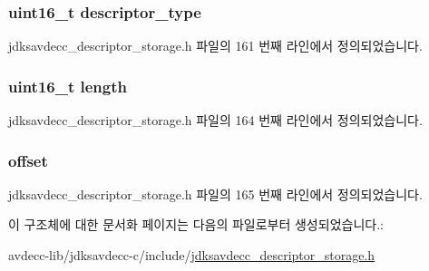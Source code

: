 \subsubsection[{\texorpdfstring{descriptor\+\_\+type}{descriptor_type}}]{\setlength{\rightskip}{0pt plus 5cm}uint16\+\_\+t descriptor\+\_\+type}\hypertarget{structjdksavdecc__descriptor__storage__item_ab7c32b6c7131c13d4ea3b7ee2f09b78d}{}\label{structjdksavdecc__descriptor__storage__item_ab7c32b6c7131c13d4ea3b7ee2f09b78d}


jdksavdecc\+\_\+descriptor\+\_\+storage.\+h 파일의 161 번째 라인에서 정의되었습니다.

\subsubsection[{\texorpdfstring{length}{length}}]{\setlength{\rightskip}{0pt plus 5cm}uint16\+\_\+t length}\hypertarget{structjdksavdecc__descriptor__storage__item_a1892eba2086d12ac2b09005aeb09ea3b}{}\label{structjdksavdecc__descriptor__storage__item_a1892eba2086d12ac2b09005aeb09ea3b}


jdksavdecc\+\_\+descriptor\+\_\+storage.\+h 파일의 164 번째 라인에서 정의되었습니다.

\subsubsection[{\texorpdfstring{offset}{offset}}]{ offset}\hypertarget{structjdksavdecc__descriptor__storage__item_a894bdfa2d603d8343f8ef01dda6fcd23}{}\label{structjdksavdecc__descriptor__storage__item_a894bdfa2d603d8343f8ef01dda6fcd23}


jdksavdecc\+\_\+descriptor\+\_\+storage.\+h 파일의 165 번째 라인에서 정의되었습니다.



이 구조체에 대한 문서화 페이지는 다음의 파일로부터 생성되었습니다.\+:\begin{DoxyCompactItemize}
\item 
avdecc-\/lib/jdksavdecc-\/c/include/\hyperlink{jdksavdecc__descriptor__storage_8h}{jdksavdecc\+\_\+descriptor\+\_\+storage.\+h}\end{DoxyCompactItemize}
